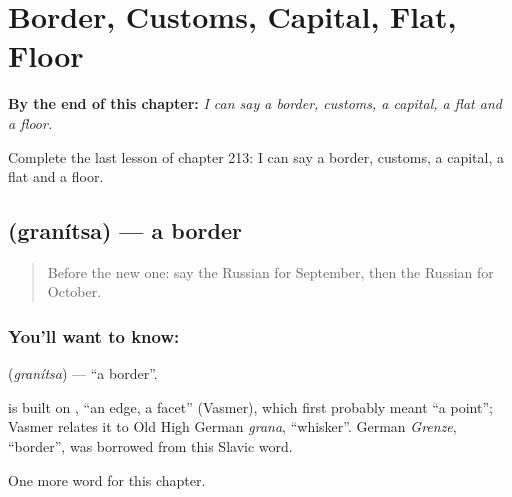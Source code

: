 
\chapter{Border, Customs, Capital, Flat, Floor}
\label{ch:ru-border-customs-capital-flat-floor}

\begin{chapteropening}
\textbf{By the end of this chapter:} \emph{I can say a border, customs, a capital, a flat and a floor.}

Complete the last lesson of chapter 213: I can say a border, customs, a capital, a flat and a floor.
\end{chapteropening}

\section[\texorpdfstring{\ru{граница} (granítsa)}{граница (granítsa)}]{ (granítsa) — a border}

\label{lesson:RU-C213-granitsa}



\begin{quote}
Before the new one: say the Russian for September, then the Russian for October.
\end{quote}

\subsection*{You'll want to know: }
\textbf{} (\emph{granítsa}) — \textquotedblleft{}a border\textquotedblright{}.

\begin{cousinweb}
\textbf{} is built on \emph{}, \textquotedblleft{}an edge, a facet\textquotedblright{} (Vasmer), which first probably meant \textquotedblleft{}a point\textquotedblright{}; Vasmer relates it to Old High German \emph{grana}, \textquotedblleft{}whisker\textquotedblright{}. German \emph{Grenze}, \textquotedblleft{}border\textquotedblright{}, was borrowed from this Slavic word.
\end{cousinweb}

\begin{grammarlens}[title={What you've built}]
One more word for this chapter.
\end{grammarlens}

